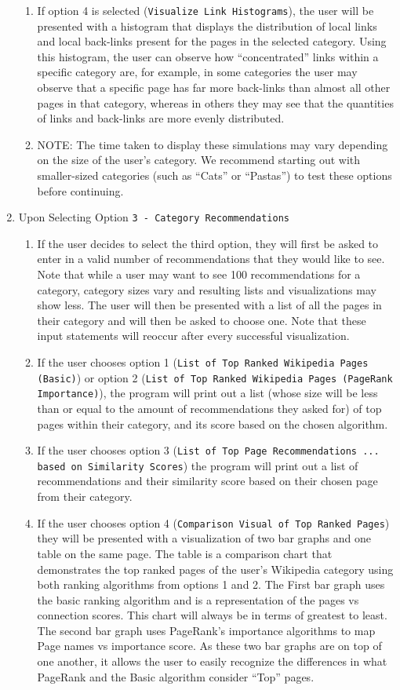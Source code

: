 \documentclass[fontsize=11pt]{article}
\begin{document}
\begin{enumerate}
\begin{enumerate}
        \item If option 4 is selected (\texttt{Visualize Link Histograms}), the user will be presented with a histogram that displays the distribution of local links and local back-links present for the pages in the selected category. Using this histogram, the user can observe how ``concentrated'' links within a specific category are, for example, in some categories the user may observe that a specific page has far more back-links than almost all other pages in that category, whereas in others they may see that the quantities of links and back-links are more evenly distributed.
        \item NOTE: The time taken to display these simulations may vary depending on the size of the user's category. We recommend starting out with smaller-sized categories (such as ``Cats'' or ``Pastas'') to test these options before continuing. 
    \end{enumerate}
    
    \item Upon Selecting Option \texttt{3 - Category Recommendations}  
    \begin{enumerate}
        \item If the user decides to select the third option, they will first be asked to enter in a valid number of recommendations that they would like to see. Note that while a user may want to see 100 recommendations for a category, category sizes vary and resulting lists and visualizations may show less. The user will then be presented with a list of all the pages in their category and will then be asked to choose one. Note that these input statements will reoccur after every successful visualization. 
        \item If the user chooses option 1 (\texttt{List of Top Ranked Wikipedia Pages (Basic)}) or option 2 (\texttt{List of Top Ranked Wikipedia Pages (PageRank Importance)}), the program will print out a list (whose size will be less than or equal to the amount of recommendations they asked for) of top pages within their category, and its score based on the chosen algorithm. 
        \item If the user chooses option 3 (\texttt{List of Top Page Recommendations ... based on Similarity Scores}) the program will print out a list of recommendations and their similarity score based on their chosen page from their category. 
        \item If the user chooses option 4 (\texttt{Comparison Visual of Top Ranked Pages}) they will be presented with a visualization of two bar graphs and one table on the same page. The table is a comparison chart that demonstrates the top ranked pages of the user's Wikipedia category using both ranking algorithms from options 1 and 2. The First bar graph uses the basic ranking algorithm and is a representation of the pages vs connection scores. This chart will always be in terms of greatest to least. The second bar graph uses PageRank's importance algorithms to map Page names vs importance score. As these two bar graphs are on top of one another, it allows the user to easily recognize the differences in what PageRank and the Basic algorithm consider ``Top'' pages.
        

\end{enumerate}
\end{enumerate}
\end{document}
